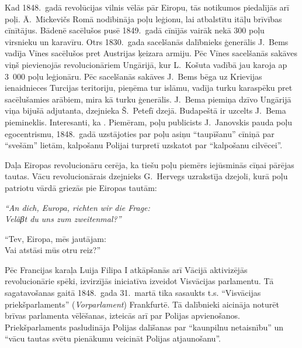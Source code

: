 \documentclass[twoside,a5paper,12pt,fleqn,openany]{extbook}
\newcommand{\detxti}[1]{\textit{\textgerman{#1}}}
\begin{document}
Kad 1848.~gadā revolūcijas vilnis vēlās pār Eiropu, tās notikumos piedalījās arī poļi. Ā.~Mickevičs Romā nodibināja poļu leģionu, lai atbalstītu itāļu brīvības cīnītājus. Bādenē sacēlušos pusē 1849.~gadā cīnījās vairāk nekā 300 poļu virsnieku un karavīru. Otrs 1830.~gada sacelšanās dalībnieks ģenerālis J.~Bems vadīja Vīnes sacēlušos pret Austrijas ķeizara armiju. Pēc Vīnes sacelšanās sakāves viņš pievienojās revolucionāriem Ungārijā, kur L.~Košuta vadībā jau karoja ap 3~000 poļu leģionāru. Pēc sacelšanās sakāves J.~Bems bēga uz Krievijas ienaidnieces Turcijas teritoriju, pieņēma tur islāmu, vadīja turku karaspēku pret sacēlušamies arābiem, mira kā turku ģenerālis. J.~Bema piemiņa dzīvo Ungārijā viņa bijušā adjutanta, dzejnieka Š.~Petefī dzejā. Budapeštā ir uzcelts J.~Bema piemineklis. Interesanti, ka . Piemēram, poļu publicists J.~Janovskis pauda poļu egocentrismu, 1848.~gadā uzstājoties par poļu asiņu ``taupīšanu'' cīniņā par ``svešām'' lietām, kalpošanu Polijai turpretī uzskatot par ``kalpošanu cilvēcei''.

Daļa Eiropas revolucionāru cerēja, ka tiešu poļu piemērs iejūsminās cīņai pārējas tautas. Vācu revolucionārais dzejnieks G.~Hervegs uzrakstīja dzejoli, kurā poļu patriotu vārdā griezās pie Eiropas tautām:

\vspace{1.5em}

\noindent
\begin{minipage}{0.6\textwidth}
\detxti{
``An dich, Europa, richten wir die Frage:\\
Veläβt du uns zum zweitenmal?''}
\end{minipage}
\hspace{1em}
\begin{minipage}{0.45\textwidth}
``Tev, Eiropa, mēs jautājam:\\
Vai atstāsi mūs otru reiz?''
\end{minipage}

\vspace{1.5em}



Pēc Francijas karaļa Luija Filipa I atkāpšanās arī Vācijā aktivizējās revolucionārie spēki, izvirzījās iniciatīva izveidot Visvācijas parlamentu. Tā sagatavošanas gaitā 1848.~gada 31.~martā tika sasaukts t.s. ``Visvācijas priekšparlaments'' (\detxti{Vorparlament}) Frankfurtē. Tā dalībnieki aicināja noturēt brīvas parlamenta vēlēšanas, izteicās arī par Polijas apvienošanos. Priekšparlaments pasludināja Polijas dalīšanas par ``kaunpilnu netaisnību'' un ``vācu tautas svētu pienākumu veicināt Polijas atjaunošanu''.
\end{document}
